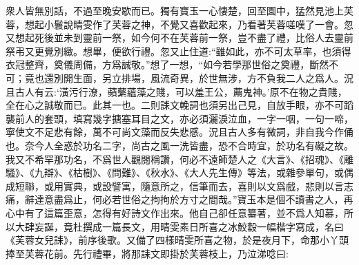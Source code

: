 \begin{parag}
    衆人皆無別話，不過至晚安歇而已。獨有寶玉一心悽楚，回至園中，猛然見池上芙蓉，想起小鬟說晴雯作了芙蓉之神，不覺又喜歡起來，乃看著芙蓉嗟嘆了一會。忽又想起死後並未到靈前一祭，如今何不在芙蓉前一祭，豈不盡了禮，比俗人去靈前祭弔又更覺別緻。想畢，便欲行禮。忽又止住道:“雖如此，亦不可太草率，也須得衣冠整齊，奠儀周備，方爲誠敬。”想了一想，“如今若學那世俗之奠禮，斷然不可；竟也還別開生面，另立排場，風流奇異，於世無涉，方不負我二人之爲人。況且古人有云:‘潢污行潦，蘋蘩蘊藻之賤，可以羞王公，薦鬼神。’原不在物之貴賤，全在心之誠敬而已。此其一也。二則誄文輓詞也須另出己見，自放手眼，亦不可蹈襲前人的套頭，填寫幾字搪塞耳目之文，亦必須灑淚泣血，一字一咽，一句一啼，寧使文不足悲有餘，萬不可尚文藻而反失悲慼。況且古人多有微詞，非自我今作俑也。奈今人全惑於功名二字，尚古之風一洗皆盡，恐不合時宜，於功名有礙之故。我又不希罕那功名，不爲世人觀閱稱讚，何必不遠師楚人之《大言》、《招魂》、《離騷》、《九辯》、《枯樹》、《問難》、《秋水》、《大人先生傳》等法，或雜參單句，或偶成短聯，或用實典，或設譬寓，隨意所之，信筆而去，喜則以文爲戲，悲則以言志痛，辭達意盡爲止，何必若世俗之拘拘於方寸之間哉。”寶玉本是個不讀書之人，再心中有了這篇歪意，怎得有好詩文作出來。他自己卻任意纂著，並不爲人知慕，所以大肆妄誕，竟杜撰成一篇長文，用晴雯素日所喜之冰鮫縠一幅楷字寫成，名曰《芙蓉女兒誄》，前序後歌。又備了四樣晴雯所喜之物，於是夜月下，命那小丫頭捧至芙蓉花前。先行禮畢，將那誄文即掛於芙蓉枝上，乃泣涕唸曰:
\end{parag}



